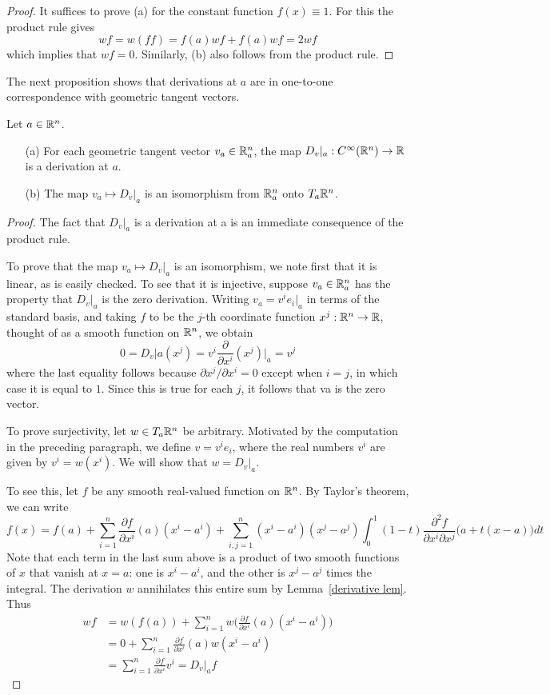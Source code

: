 \begin{proof}
It suffices to prove (a) for the constant function $f(x)\equiv 1$. For this the product rule gives
\[wf=w(ff)=f(a)wf+f(a)wf=2wf\]
which implies that $wf=0$. Similarly, (b) also follows from the product rule.
\end{proof}
The next proposition shows that derivations at $a$ are in one-to-one correspondence with geometric tangent vectors.
\begin{proposition}\label{derivative iso}
Let $a\in\mathbb{R}^n$.
\begin{itemize}
\item[(a)]For each geometric tangent vector $v_a\in\mathbb{R}^n_a$, the map $D_v|_a:C^\infty(\mathbb{R}^n)\to\mathbb{R}$ is a derivation at $a$.
\item[(b)]The map $v_a\mapsto D_v|_a$ is an isomorphism from $\mathbb{R}^n_a$ onto $T_a\mathbb{R}^n$.
\end{itemize}
\end{proposition}
\begin{proof}
The fact that $D_v|_a$ is a derivation at a is an immediate consequence of the product rule.\par
To prove that the map $v_a\mapsto D_v|_a$ is an isomorphism, we note first that it is linear, as is easily checked. To see that it is injective, suppose $v_a\in\mathbb{R}^n_a$ has the property that $D_v|_a$ is the zero derivation. Writing $v_a=v^ie_i|_a$ in terms of the standard basis, and taking $f$ to be the $j$-th coordinate function $x^j:\mathbb{R}^n\to\mathbb{R}$, thought of as a smooth function on $\mathbb{R}^n$, we obtain
\[0=D_v|a(x^j)=v^i\frac{\partial}{\partial x^i}(x^j)\Big|_a=v^j\]
where the last equality follows because $\partial x^j/\partial x^i=0$ except when $i=j$, in which case it is equal to $1$. Since this is true for each $j$, it follows that va is the zero vector.\par
To prove surjectivity, let $w\in T_a\mathbb{R}^n$ be arbitrary. Motivated by the computation in the preceding paragraph, we define $v=v^ie_i$, where the real numbers $v^i$ are given by $v^i=w(x^i)$. We will show that $w=D_v|_a$.\par 
To see this, let $f$ be any smooth real-valued function on $\mathbb{R}^n$. By Taylor's theorem, we can write
\[f(x)=f(a)+\sum_{i=1}^{n}\frac{\partial f}{\partial x^i}(a)(x^i-a^i)+\sum_{i,j=1}^{n}(x^i-a^i)(x^j-a^j)\int_{0}^{1}(1-t)\frac{\partial^2f}{\partial x^i\partial x^j}\big(a+t(x-a)\big)dt\]
Note that each term in the last sum above is a product of two smooth functions of $x$ that vanish at $x=a$: one is $x^i-a^i$, and the other is $x^j-a^j$ times the integral. The derivation $w$ annihilates this entire sum by Lemma~\ref{derivative lem}. Thus
\begin{align*}
wf&=w(f(a))+\sum_{i=1}^{n}w\big(\frac{\partial f}{\partial x^i}(a)(x^i-a^i)\big)\\
&=0+\sum_{i=1}^{n}\frac{\partial f}{\partial x^i}(a)w(x^i-a^i)\\
&=\sum_{i=1}^{n}\frac{\partial f}{\partial x^i}v^i=D_v|_af
\end{align*}
\end{proof}
